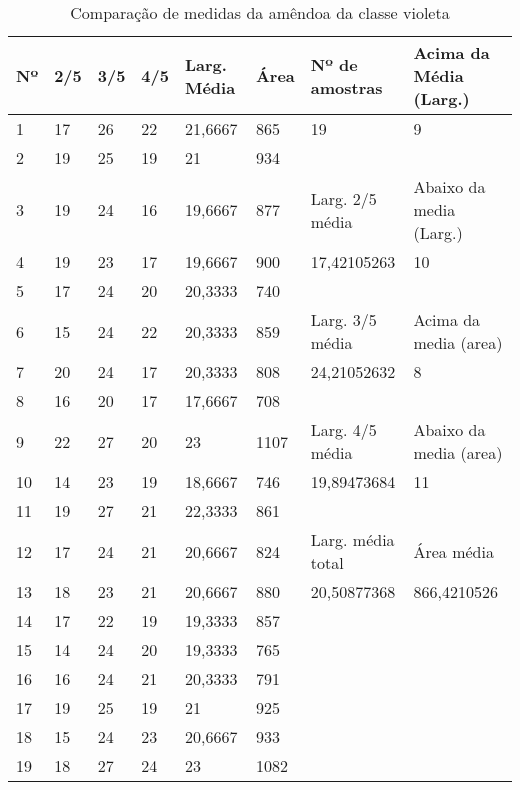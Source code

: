 \begin{anexosenv}
\begin{table}[hbtp!]
\centering
\caption{Comparação de medidas da amêndoa da classe violeta}
\label{tab:medidas_classe_violeta}
\begin{tabular}{|l|l|l|l|l|l|l|l|}
\hline
Nº & 2/5 & 3/5 & 4/5 & Larg. Média & Área & Nº de amostras & Acima da Média (Larg.) \\ \hline
1  & 17  & 26  & 22  & 21,6667     & 865  & 19               & 9                      \\
2  & 19  & 25  & 19  & 21          & 934  &                  &                        \\\cline{7-8}
3  & 19  & 24  & 16  & 19,6667     & 877  & \multicolumn{1}{l|}{Larg. 2/5 média}   & \multicolumn{1}{l|}{Abaixo da media (Larg.)} \\\cline{7-8}
4  & 19  & 23  & 17  & 19,6667     & 900  & 17,42105263      & 10                     \\
5  & 17  & 24  & 20  & 20,3333     & 740  &                  &                        \\\cline{7-8}
6  & 15  & 24  & 22  & 20,3333     & 859  & \multicolumn{1}{l|}{Larg. 3/5 média}   & \multicolumn{1}{l|}{Acima da media (area)}  \\\cline{7-8}
7  & 20  & 24  & 17  & 20,3333     & 808  & 24,21052632      & 8                      \\
8  & 16  & 20  & 17  & 17,6667     & 708  &                  &                        \\\cline{7-8}
9  & 22  & 27  & 20  & 23          & 1107 & \multicolumn{1}{l|}{Larg. 4/5 média}   & \multicolumn{1}{l|}{Abaixo da media (area)} \\\cline{7-8}
10 & 14  & 23  & 19  & 18,6667     & 746  & 19,89473684      & 11                     \\
11 & 19  & 27  & 21  & 22,3333     & 861  &                  &                        \\\cline{7-8}
12 & 17  & 24  & 21  & 20,6667     & 824  & Larg. média total & \multicolumn{1}{l|}{Área média}             \\\cline{7-8}
13 & 18  & 23  & 21  & 20,6667     & 880  & 20,50877368      & 866,4210526            \\
14 & 17  & 22  & 19  & 19,3333     & 857  &                  &                        \\
15 & 14  & 24  & 20  & 19,3333     & 765  &                  &                        \\
16 & 16  & 24  & 21  & 20,3333     & 791  &                  &                        \\
17 & 19  & 25  & 19  & 21          & 925  &                  &                        \\
18 & 15  & 24  & 23  & 20,6667     & 933  &                  &                        \\
19 & 18  & 27  & 24  & 23          & 1082 &                  &                       \\\hline
\end{tabular}
\end{table}



\end{anexosenv}
